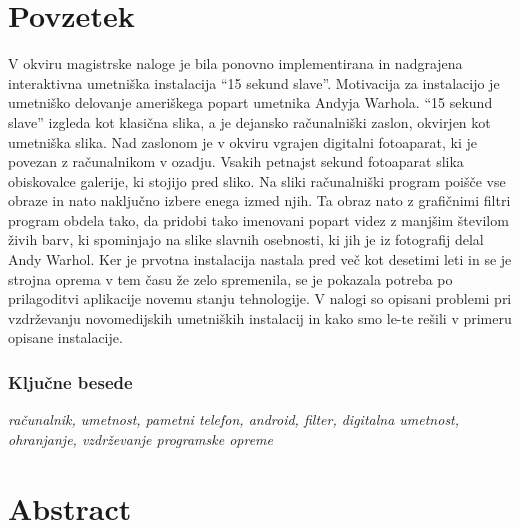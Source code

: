 \documentclass[a4paper, 12pt]{book}
\begin{document}
\chapter{Povzetek}

V okviru magistrske naloge je bila ponovno implementirana in nadgrajena
interaktivna umetniška instalacija ``15 sekund slave''. Motivacija za
instalacijo je umetniško delovanje ameriškega popart umetnika Andyja Warhola.
``15 sekund slave'' izgleda kot klasična slika, a je dejansko računalniški
zaslon, okvirjen kot umetniška slika. Nad zaslonom je v okviru vgrajen
digitalni fotoaparat, ki je povezan z računalnikom v ozadju. Vsakih petnajst
sekund fotoaparat slika obiskovalce galerije, ki stojijo pred sliko. Na sliki
računalniški program poišče vse obraze in nato naključno izbere enega izmed
njih. Ta obraz nato z grafičnimi filtri program obdela tako, da pridobi tako
imenovani popart videz z manjšim številom živih barv, ki spominjajo na
slike slavnih osebnosti, ki jih je iz fotografij delal Andy Warhol. Ker je
prvotna instalacija nastala pred več kot desetimi leti in se je strojna oprema v
tem času že zelo spremenila, se je pokazala potreba po prilagoditvi aplikacije
novemu stanju tehnologije. V nalogi so opisani problemi pri vzdrževanju
novomedijskih umetniških instalacij in kako smo le-te rešili v primeru opisane
instalacije.

\subsection*{Ključne besede}
\textit{računalnik, umetnost, pametni telefon, android, filter, digitalna umetnost, ohranjanje, vzdrževanje programske opreme}
\clearemptydoublepage



\chapter{Abstract}
\end{document}
